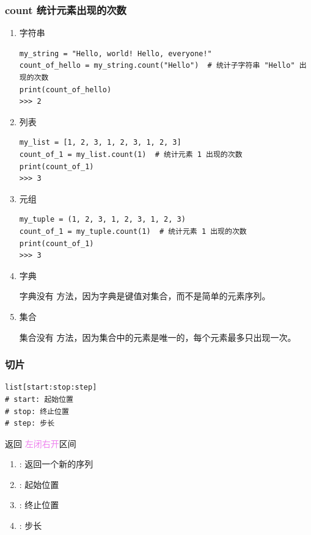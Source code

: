 \subsubsection{count 统计元素出现的次数}
\begin{enumerate}[label=\arabic*)]
    \item 字符串
\begin{lstlisting}[style=demostyle,numbers=none]
my_string = "Hello, world! Hello, everyone!"
count_of_hello = my_string.count("Hello")  # 统计子字符串 "Hello" 出现的次数
print(count_of_hello) 
>>> 2
\end{lstlisting}

    \item 列表
\begin{lstlisting}[style=demostyle,numbers=none]
my_list = [1, 2, 3, 1, 2, 3, 1, 2, 3]
count_of_1 = my_list.count(1)  # 统计元素 1 出现的次数
print(count_of_1)
>>> 3
\end{lstlisting}

    \item 元组
\begin{lstlisting}[style=demostyle,numbers=none]
my_tuple = (1, 2, 3, 1, 2, 3, 1, 2, 3)
count_of_1 = my_tuple.count(1)  # 统计元素 1 出现的次数
print(count_of_1)
>>> 3
\end{lstlisting}

    \item 字典

    字典没有  方法，因为字典是键值对集合，而不是简单的元素序列。

    \item 集合

    集合没有  方法，因为集合中的元素是唯一的，每个元素最多只出现一次。
\end{enumerate}


\subsubsection{切片}
\begin{lstlisting}[style=demostyle,numbers=none]
list[start:stop:step]
# start: 起始位置
# stop: 终止位置
# step: 步长
\end{lstlisting}

返回 \textcolor{violet}{左闭右开}区间
\begin{enumerate}[label=\arabic*)]
    \item {}: 返回一个新的序列
    \item {}: 起始位置
    \item {}: 终止位置
    \item {}: 步长
\end{enumerate}

